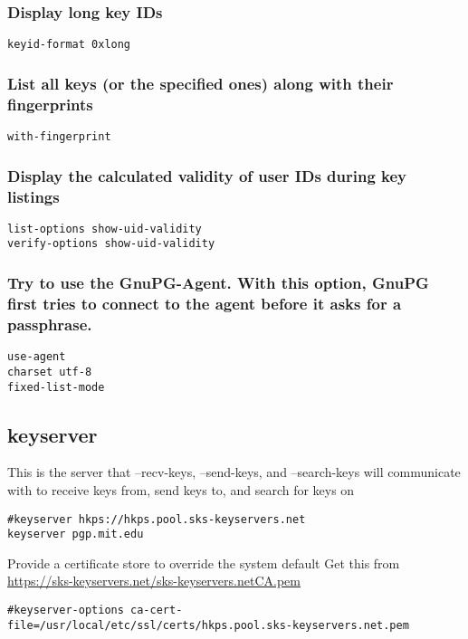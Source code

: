\documentclass[11pt]{article}
\begin{document}
\subsubsection{Display long key IDs}
\label{sec:org620d5c4}
\begin{verbatim}
keyid-format 0xlong
\end{verbatim}
\subsubsection{List all keys (or the specified ones) along with their fingerprints}
\label{sec:orgbcaf6ca}
\begin{verbatim}
with-fingerprint
\end{verbatim}
\subsubsection{Display the calculated validity of user IDs during key listings}
\label{sec:org171c80d}
\begin{verbatim}
list-options show-uid-validity
verify-options show-uid-validity
\end{verbatim}
\subsubsection{Try to use the GnuPG-Agent. With this option, GnuPG first tries to connect to the agent before it asks for a passphrase.}
\label{sec:org699ed46}
\begin{verbatim}
use-agent
charset utf-8
fixed-list-mode
\end{verbatim}
\subsection{keyserver}
\label{sec:orgeb41373}
This is the server that --recv-keys, --send-keys, and --search-keys will communicate with to receive keys from, send keys to, and search for keys on
\begin{verbatim}
#keyserver hkps://hkps.pool.sks-keyservers.net
keyserver pgp.mit.edu
\end{verbatim}

Provide a certificate store to override the system default
Get this from \url{https://sks-keyservers.net/sks-keyservers.netCA.pem}
\begin{verbatim}
#keyserver-options ca-cert-file=/usr/local/etc/ssl/certs/hkps.pool.sks-keyservers.net.pem
\end{verbatim}
\end{document}
